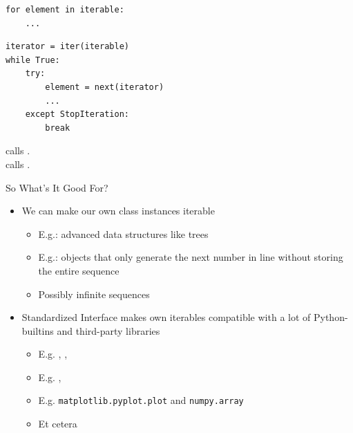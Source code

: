 \begin{frame}[fragile]
%
\vspace{-3pt}
\begin{codebox}
\begin{verbatim}
for element in iterable:
    ...
\end{verbatim}
\end{codebox}

\vspace{-9pt}
\begin{codebox}
\begin{verbatim}
iterator = iter(iterable)
while True:
    try:
        element = next(iterator)
        ...
    except StopIteration:
        break
\end{verbatim}
\end{codebox}

\vspace{-9pt}
\begin{hintbox}
\footnotesize
{} calls .\\
 calls .
\end{hintbox}
%
\end{frame}


\begin{frame}{So What's It Good For?}
%
\begin{itemize}
\item We can make our own class instances iterable
	\begin{itemize}
	\item E.\;g.: advanced data structures like trees
	\item E.\;g.: objects that only generate the next number in line without storing the entire sequence
	\item[\Thus] Possibly infinite sequences
	\end{itemize}
\item Standardized Interface makes own iterables compatible with a lot of Python-builtins and third-party libraries
	\begin{itemize}
	\item E.\;g. , , 
	\item E.\;g. , 
	\item E.\;g. \texttt{matplotlib.pyplot.plot} and \texttt{numpy.array}
	\item Et cetera
	\end{itemize}
\end{itemize}
%
\end{frame}

